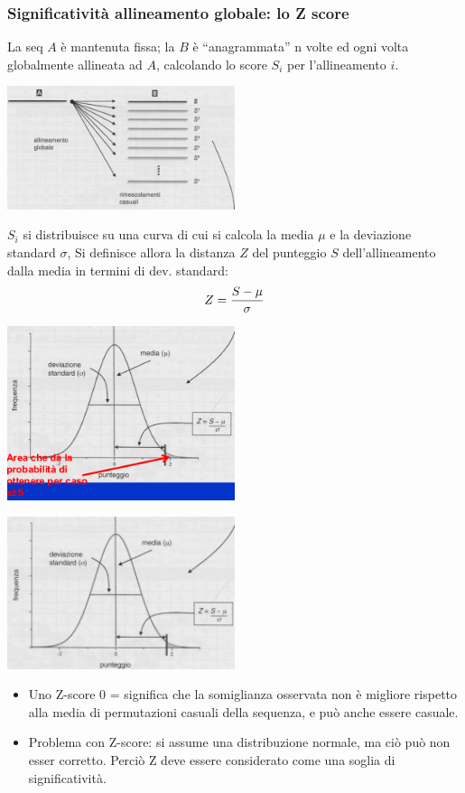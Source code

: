 \documentclass{article}
\begin{document}
\subsubsection{Significatività allineamento globale: lo Z score}
La seq $A$ è mantenuta fissa; la $B$ è
“anagrammata” n volte ed ogni volta
globalmente allineata ad $A$, calcolando
lo score $S_i$ per l'allineamento $i$.
\begin{center}
    \includegraphics[width=0.5\textwidth]{figures/sig1.png}\\
\end{center}
$S_i$ si distribuisce su una curva di cui si
calcola la media $\mu$ e la deviazione
standard $\sigma$, Si definisce allora la
distanza $Z$ del punteggio $S$
dell'allineamento dalla media in termini
di dev. standard:
$$ Z = { S -\mu \over \sigma}$$
\begin{center}
    \includegraphics[width=0.5\textwidth]{figures/sig2.png}\\
\end{center}
\begin{center}
    \includegraphics[width=0.5\textwidth]{figures/sig3.png}\\
\end{center}
\begin{itemize}
    \item Uno Z-score 0 = significa che la somiglianza osservata non è migliore
    rispetto alla media di permutazioni casuali della sequenza, e può anche
    essere casuale.
    \item Problema con Z-score: si assume una distribuzione normale, ma ciò
    può non esser corretto. Perciò Z deve essere considerato come una
    soglia di significatività.
\end{itemize}
\end{document}
